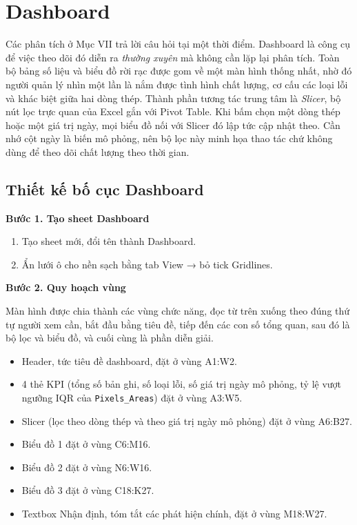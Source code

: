 \documentclass[12pt]{article}
\begin{document}
\section{Dashboard}

Các phân tích ở Mục VII trả lời câu hỏi tại một thời điểm. Dashboard là công cụ để việc theo dõi đó diễn ra \emph{thường xuyên} mà không cần lặp lại phân tích. Toàn bộ bảng số liệu và biểu đồ rời rạc được gom về một màn hình thống nhất, nhờ đó người quản lý nhìn một lần là nắm được tình hình chất lượng, cơ cấu các loại lỗi và khác biệt giữa hai dòng thép. Thành phần tương tác trung tâm là \emph{Slicer}, bộ nút lọc trực quan của Excel gắn với Pivot Table. Khi bấm chọn một dòng thép hoặc một giá trị ngày, mọi biểu đồ nối với Slicer đó lập tức cập nhật theo. Cần nhớ cột ngày là biến mô phỏng, nên bộ lọc này minh họa thao tác chứ không dùng để theo dõi chất lượng theo thời gian.

\subsection{Thiết kế bố cục Dashboard}

\textbf{Bước 1. Tạo sheet Dashboard}

\begin{enumerate}
  \item Tạo sheet mới, đổi tên thành Dashboard.
  \item Ẩn lưới ô cho nền sạch bằng tab View → bỏ tick Gridlines.
\end{enumerate}

\noindent
\textbf{Bước 2. Quy hoạch vùng}

\noindent
Màn hình được chia thành các vùng chức năng, đọc từ trên xuống theo đúng thứ tự người xem cần, bắt đầu bằng tiêu đề, tiếp đến các con số tổng quan, sau đó là bộ lọc và biểu đồ, và cuối cùng là phần diễn giải.

\begin{itemize}
  \item Header, tức tiêu đề dashboard, đặt ở vùng A1:W2.
  \item 4 thẻ KPI (tổng số bản ghi, số loại lỗi, số giá trị ngày mô phỏng, tỷ lệ vượt ngưỡng IQR của \texttt{Pixels\_Areas}) đặt ở vùng A3:W5.
  \item Slicer (lọc theo dòng thép và theo giá trị ngày mô phỏng) đặt ở vùng A6:B27.
  \item Biểu đồ 1 đặt ở vùng C6:M16.
  \item Biểu đồ 2 đặt ở vùng N6:W16.
  \item Biểu đồ 3 đặt ở vùng C18:K27.
  \item Textbox Nhận định, tóm tắt các phát hiện chính, đặt ở vùng M18:W27.
\end{itemize}
\end{document}
